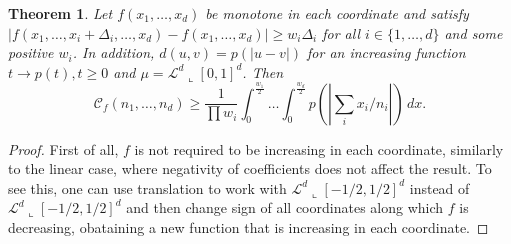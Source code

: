 \documentclass{amsart}
\newtheorem{theorem}{Theorem}[section]
\theoremstyle{remark}
\numberwithin{equation}{section}
\numberwithin{figure}{section}
\newcommand{\res}{\llcorner}
\begin{document}
\begin{theorem}
	Let $f(x_1, \ldots, x_d)$ be monotone in each coordinate and satisfy $|f(x_1, \ldots, x_i + \Delta_i, \ldots, x_d) - f(x_1, \ldots, x_d)| \geq w_i \Delta_i$ for all $i\in \{1, \ldots, d\}$ and some positive $w_i$. In addition, $d(u, v) = p(|u-v|)$ for an increasing function $t \to p(t), t\geq 0$ and $\mu = \mathcal{L}^d\res [0,1]^d$. Then 
	\[
	\mathcal{C}_f(n_1, \ldots, n_d) \geq \frac{1}{\prod w_i} \int_0^{\frac{w_1}{2}} \ldots \int_0^{\frac{w_d}{2}} p(|\sum_i x_i/n_i|)\, dx.
	\]
\end{theorem}
\begin{proof}
	First of all, $f$ is not required to be increasing in each coordinate, similarly to the linear case, where negativity of coefficients does not affect the result. To see this, one can use translation to work with $\mathcal{L}^d\res [-1/2,1/2]^d$ instead of $\mathcal{L}^d\res [-1/2,1/2]^d$ and then change sign of all coordinates along which $f$ is decreasing, obataining a new function that is increasing in each coordinate.
	

\end{proof}
\end{document}
